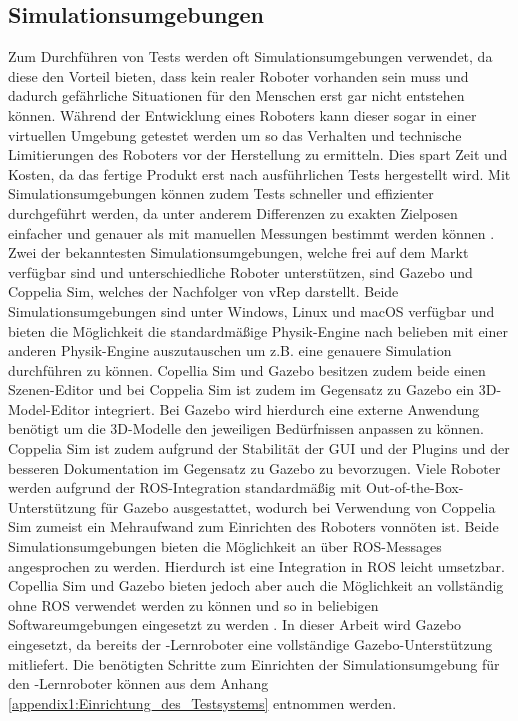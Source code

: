 \subsection{Simulationsumgebungen}
Zum Durchführen von Tests werden oft Simulationsumgebungen verwendet, da diese den Vorteil bieten, dass kein realer Roboter vorhanden sein muss und dadurch gefährliche Situationen für den Menschen erst gar nicht entstehen können. Während der Entwicklung eines Roboters kann dieser sogar in einer virtuellen Umgebung getestet werden um so das Verhalten und technische Limitierungen des Roboters vor der Herstellung zu ermitteln. Dies spart Zeit und Kosten, da das fertige Produkt erst nach ausführlichen Tests hergestellt wird. Mit Simulationsumgebungen können zudem Tests schneller und effizienter durchgeführt werden, da unter anderem Differenzen zu exakten Zielposen einfacher und genauer als mit manuellen Messungen bestimmt werden können \cite{gazebo_nodate}. Zwei der bekanntesten Simulationsumgebungen, welche frei auf dem Markt verfügbar sind und unterschiedliche Roboter unterstützen, sind Gazebo und Coppelia Sim, welches der Nachfolger von vRep darstellt. Beide Simulationsumgebungen sind unter Windows, Linux und macOS verfügbar und bieten die Möglichkeit die standardmäßige Physik-Engine nach belieben mit einer anderen Physik-Engine auszutauschen um z.B. eine genauere Simulation durchführen zu können. Copellia Sim und Gazebo besitzen zudem beide einen Szenen-Editor und bei Coppelia Sim ist zudem im Gegensatz zu Gazebo ein 3D-Model-Editor integriert. Bei Gazebo wird hierdurch eine externe Anwendung benötigt um die 3D-Modelle den jeweiligen Bedürfnissen anpassen zu können. Coppelia Sim ist zudem aufgrund der Stabilität der GUI und der Plugins und der besseren Dokumentation im Gegensatz zu Gazebo zu bevorzugen. Viele Roboter werden aufgrund der ROS-Integration standardmäßig mit Out-of-the-Box-Unterstützung für Gazebo ausgestattet, wodurch bei Verwendung von Coppelia Sim zumeist ein Mehraufwand zum Einrichten des Roboters vonnöten ist. Beide Simulationsumgebungen bieten die Möglichkeit an über ROS-Messages angesprochen zu werden. Hierdurch ist eine Integration in ROS leicht umsetzbar. Copellia Sim und Gazebo bieten jedoch aber auch die Möglichkeit an vollständig ohne ROS verwendet werden zu können und so in beliebigen Softwareumgebungen eingesetzt zu werden \cite{vrep_vs_gazebo_nodate}. In dieser Arbeit wird Gazebo eingesetzt, da bereits der -Lernroboter eine vollständige Gazebo-Unterstützung mitliefert. Die benötigten Schritte zum Einrichten der Simulationsumgebung für den -Lernroboter können aus dem Anhang \ref{appendix1:Einrichtung_des_Testsystems} entnommen werden.

